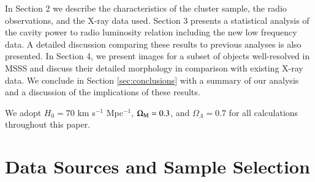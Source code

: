 \documentclass{aa}  %
\begin{document}
In Section 2 we describe the characteristics of the cluster sample, the radio observations, and the X-ray data used.
Section 3 presents a statistical analysis of the cavity power to radio luminosity relation including the new low frequency data. A detailed discussion comparing these results to previous analyses is also presented. 
In Section 4, we present images for a subset of objects well-resolved in MSSS and discuss their detailed morphology in comparison with existing X-ray data.
We conclude in Section \ref{sec:conclusions} with a summary of our analysis and a discussion of the implications of these results.

We adopt $H_{0}=70$ km s$^{-1}$ Mpc$^{-1}$, $\Omega_{\rm{M}}=0.3$, and $\Omega_{\Lambda}=0.7$ for all calculations throughout this paper. \\






\section{Data Sources and Sample Selection}
\end{document}
